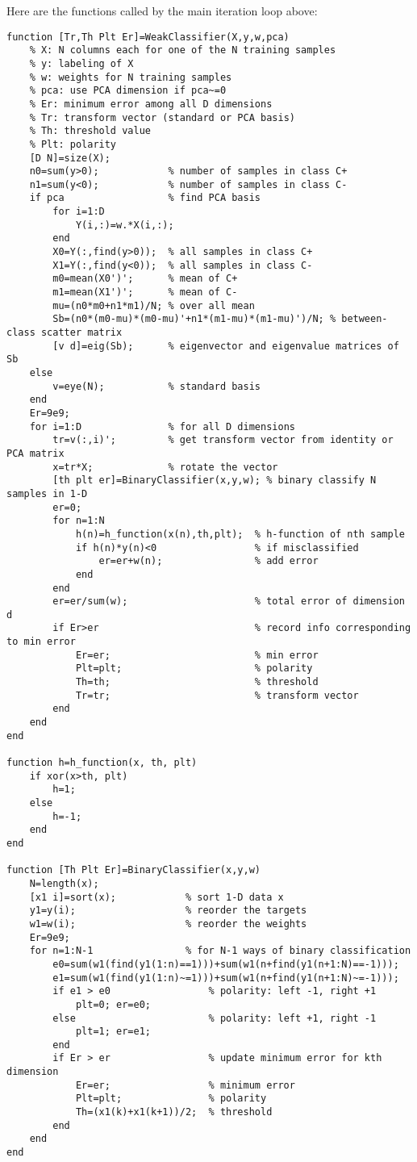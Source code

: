 \documentclass{article}
\begin{document}
Here are the functions called by the main iteration loop above:

\begin{verbatim}
function [Tr,Th Plt Er]=WeakClassifier(X,y,w,pca)
    % X: N columns each for one of the N training samples
    % y: labeling of X
    % w: weights for N training samples
    % pca: use PCA dimension if pca~=0
    % Er: minimum error among all D dimensions
    % Tr: transform vector (standard or PCA basis)
    % Th: threshold value 
    % Plt: polarity 
    [D N]=size(X);
    n0=sum(y>0);            % number of samples in class C+
    n1=sum(y<0);            % number of samples in class C-
    if pca                  % find PCA basis
        for i=1:D
            Y(i,:)=w.*X(i,:);
        end
        X0=Y(:,find(y>0));  % all samples in class C+
        X1=Y(:,find(y<0));  % all samples in class C-
        m0=mean(X0')';      % mean of C+
        m1=mean(X1')';      % mean of C-
        mu=(n0*m0+n1*m1)/N; % over all mean
        Sb=(n0*(m0-mu)*(m0-mu)'+n1*(m1-mu)*(m1-mu)')/N; % between-class scatter matrix
        [v d]=eig(Sb);      % eigenvector and eigenvalue matrices of Sb
    else
        v=eye(N);           % standard basis
    end  
    Er=9e9;
    for i=1:D               % for all D dimensions
        tr=v(:,i)';         % get transform vector from identity or PCA matrix
        x=tr*X;             % rotate the vector
        [th plt er]=BinaryClassifier(x,y,w); % binary classify N samples in 1-D
        er=0;
        for n=1:N
            h(n)=h_function(x(n),th,plt);  % h-function of nth sample 
            if h(n)*y(n)<0                 % if misclassified
                er=er+w(n);                % add error
            end
        end   
        er=er/sum(w);                      % total error of dimension d
        if Er>er                           % record info corresponding to min error
            Er=er;                         % min error
            Plt=plt;                       % polarity
            Th=th;                         % threshold
            Tr=tr;                         % transform vector
        end
    end 
end

function h=h_function(x, th, plt)
    if xor(x>th, plt)
        h=1;
    else
        h=-1;
    end
end

function [Th Plt Er]=BinaryClassifier(x,y,w)
    N=length(x); 
    [x1 i]=sort(x);            % sort 1-D data x
    y1=y(i);                   % reorder the targets 
    w1=w(i);                   % reorder the weights 
    Er=9e9;
    for n=1:N-1                % for N-1 ways of binary classification       
        e0=sum(w1(find(y1(1:n)==1)))+sum(w1(n+find(y1(n+1:N)==-1)));
        e1=sum(w1(find(y1(1:n)~=1)))+sum(w1(n+find(y1(n+1:N)~=-1)));
        if e1 > e0                 % polarity: left -1, right +1
            plt=0; er=e0; 
        else                       % polarity: left +1, right -1
            plt=1; er=e1;
        end
        if Er > er                 % update minimum error for kth dimension
            Er=er;                 % minimum error
            Plt=plt;               % polarity
            Th=(x1(k)+x1(k+1))/2;  % threshold
        end        
    end
end
\end{verbatim}
\end{document}
